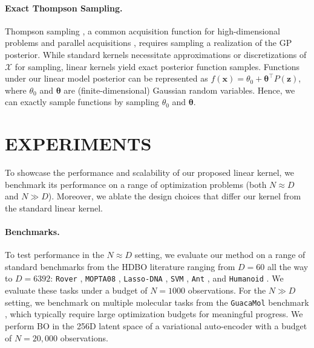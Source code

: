 \documentclass[twoside]{article}
\theoremstyle{plain}
\theoremstyle{definition}
\begin{document}
\paragraph{Exact Thompson Sampling.}
Thompson sampling \citep{thompson1933likelihood},
a common acquisition function for high-dimensional problems \citep[e.g.][]{eriksson2019scalable} and parallel acquisitions \citep[e.g.][]{hernandez2017parallel},
requires sampling a realization of the GP posterior.
While standard kernels necessitate approximations or discretizations of $\mathcal X$ for sampling,
linear kernels
yield exact posterior function samples.
Functions under our linear model posterior can be represented as $f(\mathbf x) = \theta_0 + \boldsymbol \theta^\top P(\mathbf z)$, where $\theta_0$ and $\boldsymbol \theta$ are (finite-dimensional) Gaussian random variables.
Hence, we can exactly sample functions by sampling $\theta_0$ and $\boldsymbol \theta$.

\section{\bfseries\small EXPERIMENTS} \label{sec:experiments}
To showcase the performance and scalability of our proposed linear kernel, we benchmark its performance on a range of optimization problems (both $N \approx D$ and $N \gg D$).
Moreover, we ablate the design choices that differ our kernel from the standard linear kernel.

\paragraph{Benchmarks.} To test performance in the $N \approx D$ setting, we evaluate our method on a range of standard benchmarks from the HDBO literature ranging from $D = 60$ all the way to $D = 6392$: \texttt{Rover} \citep[60D;][]{wang2018batched}, \texttt{MOPTA08} \citep[124D;][]{eriksson2021high}, \texttt{Lasso-DNA} \citep[180D;][]{nardi2022lassobench}, \texttt{SVM} \citep[388D;][]{eriksson2021high}, \texttt{Ant} \citep[888D;][]{wang2020learning}, and \texttt{Humanoid} \citep[6392D;][]{wang2020learning}.
We evaluate these tasks under a budget of $N=1000$ observations.
For the $N \gg D$ setting, we benchmark on multiple molecular tasks from the \texttt{GuacaMol} benchmark \citep{brown2019guacamol}, which typically require large optimization budgets for meaningful progress. We perform BO in the 256D latent space of a variational auto-encoder \citep{maus2022local, maus2024approximation} with a budget of $N = 20,\!000$ observations.
\end{document}
